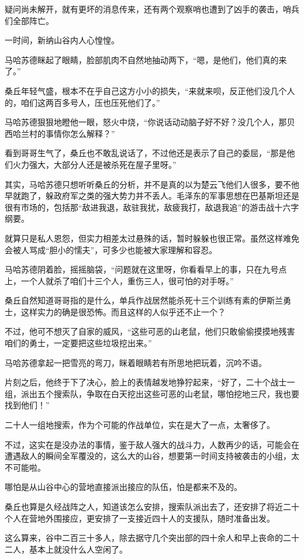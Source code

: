 疑问尚未解开，就有更坏的消息传来，还有两个观察哨也遭到了凶手的袭击，哨兵们全部阵亡。

一时间，新纳山谷内人心惶惶。

马哈苏德眯起了眼睛，脸部肌肉不自然地抽动两下，“嗯，是他们，他们真的来了。”

桑丘年轻气盛，根本不在乎自己这方小小的损失，“来就来呗，反正他们没几个人的，咱们这两百多号人，压也压死他们了。”

马哈苏德狠狠地瞪他一眼，怒火中烧，“你说话动动脑子好不好？没几个人，那贝西哈兰村的事情你怎么解释？”

看到哥哥生气了，桑丘也不敢乱说话了，不过他还是表示了自己的委屈，“那是他们火力强大，大部分人还是被杀死在屋子里呀。”

其实，马哈苏德只想听听桑丘的分析，并不是真的以为楚云飞他们人很多，要不他早就跑了，躲政府军之类的强大势力并不丢人。毛泽东的军事思想在巴基斯坦还是很有市场的，包括那“敌进我退，敌驻我扰，敌疲我打，敌退我追”的游击战十六字纲要。

就算只是私人恩怨，但实力相差太过悬殊的话，暂时躲躲也很正常。虽然这样难免会被人骂成“胆小的懦夫”，可多少也能被大家理解和容忍。

马哈苏德阴着脸，摇摇脑袋，“问题就在这里呀，你看看早上的事，只在九号点上，一个人就杀了咱们十三个人，重伤三人，很可怕的对手呀。”

桑丘自然知道哥哥指的是什么，单兵作战居然能杀死十三个训练有素的伊斯兰勇士，这样实力的确是很恐怖。而且这样的人似乎还不止一个？

不过，他可不想灭了自家的威风，“这些可恶的山老鼠，他们只敢偷偷摸摸地残害咱们的勇士，一定要把这些垃圾挖出来。”

马哈苏德拿起一把雪亮的弯刀，眯着眼睛若有所思地把玩着，沉吟不语。

片刻之后，他终于下了决心，脸上的表情越发地狰狞起来，“好了，二十个战士一组，派出五个搜索队，争取在白天挖出这些可恶的山老鼠，哪怕挖地三尺，我也要找到他们！”

二十人一组地搜索，作为个可能的作战单位，实在是大了一点，太奢侈了。

不过，这实在是没办法的事情，鉴于敌人强大的战斗力，人数再少的话，可能会在遭遇敌人的瞬间全军覆没的，这么大的山谷，想要第一时间支持被袭击的小组，太不可能啦。

哪怕是从山谷中心的营地直接派出接应的队伍，怕是都来不及的。

桑丘也算是久经战阵之人，知道该怎么安排，搜索队派出去了，还安排了将近二十个人在营地外围接应，更安排了一支接近四十人的支援队，随时准备出发。

这么算来，谷中二百三十多人，除去据守几个突出部的四十余人和早上丧命的二十二人，基本上就没什么人空闲了。

